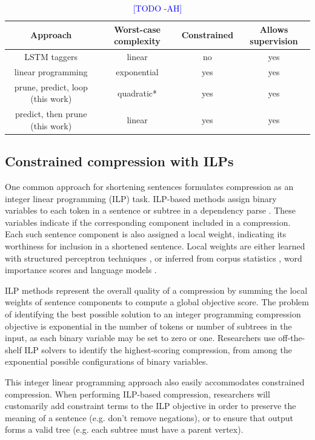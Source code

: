 \documentclass[11pt,a4paper]{article}
\newcommand{\ahcomment}[1]{\textcolor{blue}{[#1 -AH]}}
\begin{document}
\begin{table}[htb!]
\begin{tabular}{cccc}
\textbf{Approach} & \textbf{Worst-case complexity} & \textbf{Constrained} & \textbf{Allows supervision} \\ \hline
LSTM taggers      & linear              & no     &    yes      \\   
linear programming              & exponential         & yes    &    yes   \\
prune, predict, loop  (this work)    & quadratic*           & yes    &      yes   \\
predict, then prune  (this work)    & linear           & yes    &      yes   \\
\end{tabular}
\caption{\ahcomment{TODO}}
\end{table}

\subsection{Constrained compression with ILPs}

One common approach for shortening sentences formulates compression as an integer linear programming (ILP) task. ILP-based methods assign binary variables to each token in a sentence \cite{clarke2008global} or subtree in a dependency parse \cite{filippova2008dependency}. These variables indicate if the corresponding component included in a compression. Each such sentence component is also assigned a local weight, indicating its worthiness for inclusion in a shortened sentence. Local weights are either learned with structured perceptron techniques \cite{filippova2013overcoming}, or inferred from corpus statistics \cite{filippova2008dependency}, word importance scores and language models \cite{clarke2008global}.

ILP methods represent the overall quality of a compression by summing the local weights of sentence components to compute a global objective score.  The problem of identifying the best possible solution to an integer programming compression objective is exponential in the number of tokens or number of subtrees in the input, as each binary variable may be set to zero or one. Researchers use off-the-shelf ILP solvers to identify the highest-scoring compression, from among the exponential possible configurations of binary variables.

This integer linear programming approach also easily accommodates constrained compression. When performing ILP-based compression, researchers will customarily add constraint terms to the ILP objective in order to preserve the meaning of a sentence (e.g. don't remove negations), or to ensure that output forms a valid tree (e.g. each subtree must have a parent vertex).
\end{document}
